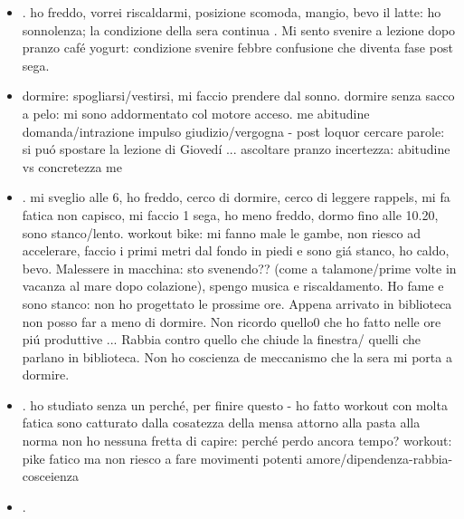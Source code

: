 \begin{itemize}
dormo in macchina invece di andare a teorie della gravitazione.
workout sto a fatica in piedi/ pulsazione pi\'u verso il collo
cosa penso mentre guido? stasera non ho voglia di cantare. sonno quando non riesco a pensare \'e come impulsi situazioni stallo?
\item {}.
ho freddo, vorrei riscaldarmi, posizione scomoda, mangio, bevo il latte: ho sonnolenza; la condizione della sera continua .
Mi sento svenire a lezione dopo pranzo caf\'e yogurt: condizione svenire febbre confusione che diventa fase post sega.
\item {}
dormire: spogliarsi/vestirsi, mi faccio prendere dal sonno.
dormire senza sacco a pelo: mi sono addormentato col motore acceso.
me abitudine
domanda/intrazione impulso giudizio/vergogna - post loquor cercare parole: si pu\'o spostare la lezione di Gioved\'i ... 
ascoltare pranzo
incertezza: abitudine vs concretezza me
\item {}.
mi sveglio alle 6, ho freddo, cerco di dormire, cerco di leggere rappels, mi fa fatica non capisco, mi faccio 1 sega, ho meno freddo, dormo fino alle 10.20, sono stanco/lento.
workout bike: mi fanno male le gambe, non riesco ad accelerare, faccio i primi metri dal fondo in piedi e sono gi\'a stanco, ho caldo, bevo.
Malessere in macchina: sto svenendo?? (come a talamone/prime volte in vacanza al mare dopo colazione), spengo musica e riscaldamento.
Ho fame e sono stanco: non ho progettato le prossime ore.
Appena arrivato in biblioteca non posso far a meno di dormire. Non ricordo quello0 che ho fatto nelle ore pi\'u produttive ...
Rabbia contro quello che chiude la finestra/ quelli che parlano in biblioteca.
Non ho coscienza de meccanismo che la sera mi porta a dormire.
\item {}.
ho studiato senza un perch\'e, per finire questo - ho fatto workout con molta fatica
sono catturato dalla cosatezza della mensa attorno alla pasta alla norma
non ho nessuna fretta di capire: perch\'e perdo ancora tempo?
workout: pike fatico ma non riesco a fare movimenti potenti
amore/dipendenza-rabbia-cosceienza
\item {}.

\end{itemize}

